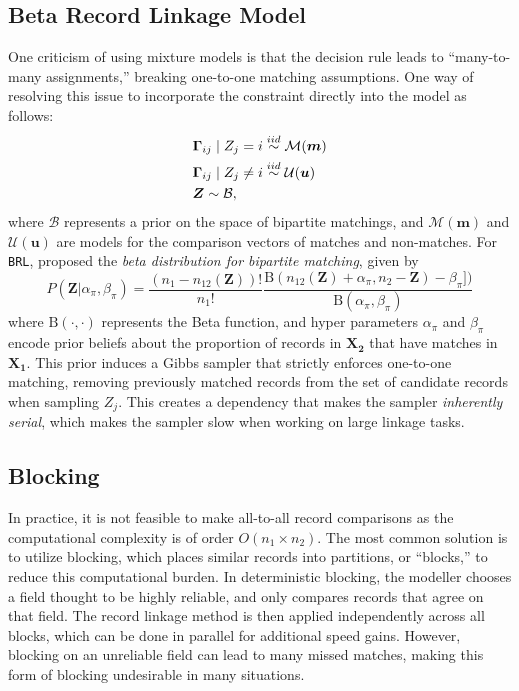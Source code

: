 \documentclass[12pt,letterpaper]{article}
\newcommand{\1}[1]{\mathbb{I}\!\left[#1\right]} %
\begin{document}
\subsection{Beta Record Linkage Model}
\label{BRL}

One criticism of using mixture models is that the decision rule leads to ``many-to-many assignments,'' breaking one-to-one matching assumptions. One way of resolving this issue to incorporate the constraint directly into the model as follows:
\begin{align}
	&\bm{\Gamma}_{ij} \mid Z_j =i \stackrel{iid}{\sim} \mathcal{M}(\bm{m})  \\
	&\bm{\Gamma}_{ij} \mid Z_j \neq i \stackrel{iid}{\sim} \mathcal{U}(\bm{u}) \notag \\
	& \bm{Z} \sim \mathcal{B}, \notag
\end{align}
where $\mathcal{B}$ represents a prior on the space of bipartite matchings, and $\mathcal{M}(\bm{m})$ and $\mathcal{U}(\bm{u})$ are models for the comparison vectors of matches and non-matches. For \texttt{BRL}, \cite{sadinle_bayesian_2017} proposed the \emph{beta distribution for bipartite matching}, given by
$$P(\bm{Z}|\alpha_{\pi}, \beta_{\pi}) = \frac{(n_1 - n_{12}(\bm{Z}))!}{n_1 !}\frac{\text{B}(n_{12}(\bm{Z}) + \alpha_{\pi}, n_2 - \bm{Z}) - \beta_{\pi}])}{\text{B}(\alpha_{\pi}, \beta_{\pi})}
$$
where $\text{B}(\cdot, \cdot)$ represents the Beta function, and hyper parameters $\alpha_{\pi}$ and $\beta_{\pi}$ encode prior beliefs about the proportion of records in $\bm{X_2}$ that have matches in $\bm{X_1}$. This prior induces a Gibbs sampler that strictly enforces one-to-one matching, removing previously matched records from the set of candidate
records when sampling \(Z_j\). This creates a dependency that makes the
sampler \emph{inherently serial}, which makes the sampler slow when working on large linkage tasks. 

\subsection{Blocking}

In practice, it is not feasible to make all-to-all record comparisons as the computational complexity is of order $O(n_1 \times n_2).$ The most common solution is to utilize blocking, which places similar records into partitions, or ``blocks,'' to reduce this computational burden. In deterministic blocking, the modeller chooses a field thought to be highly reliable, and only compares records that agree on that field. The record linkage method is then applied independently across all blocks, which can be done in parallel for additional speed gains. However, blocking on an unreliable field can lead to many missed matches, making this form of blocking undesirable in many situations.
\end{document}
